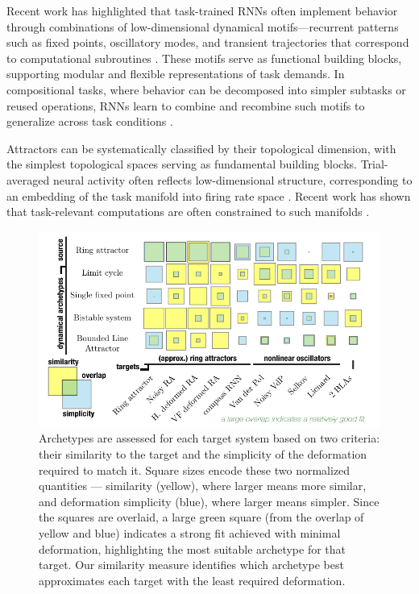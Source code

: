 \documentclass{article}
\theoremstyle{definition} \newtheorem{definition}{Definition}  \newtheorem{example}{Example}
\theoremstyle{remark} \newtheorem{remark}{Remark}
\newcounter{ct}
\begin{document}
Recent work has highlighted that task-trained RNNs often implement behavior through combinations of low-dimensional dynamical motifs—recurrent patterns such as fixed points, oscillatory modes, and transient trajectories that correspond to computational subroutines \citep{driscoll2024flexible}.
These motifs serve as functional building blocks, supporting modular and flexible representations of task demands. 
In compositional tasks, where behavior can be decomposed into simpler subtasks or reused operations, RNNs learn to combine and recombine such motifs to generalize across task conditions \citep{tafazoli2024building}.

Attractors can be systematically classified by their topological dimension, with the simplest topological spaces serving as fundamental building blocks.
Trial-averaged neural activity often reflects low-dimensional structure, corresponding to an embedding of the task manifold into firing rate space \citep{gao2015simplicity}.
Recent work has shown that task-relevant computations are often constrained to such manifolds \citep{langdon2023unifying,can2021emergence,cueva2021continuous,gort2024emergence,mishra2021continual,chaudhuri2019attractor,ghazizadeh2021slowmanifold,duncker2021dynamics, pezon2024linking,fortunato2024nonlinear}.

\begin{figure}[t!bhp]
    \centering
    \includegraphics[width=.9\linewidth]{archetype2target}
    \caption{Archetypes are assessed for each target system based on two criteria: their similarity to the target and the simplicity of the deformation required to match it. Square sizes encode these two normalized quantities — similarity (yellow), where larger means more similar, and deformation simplicity (blue), where larger means simpler.
     Since the squares are overlaid, a large green square (from the overlap of yellow and blue) indicates a strong fit achieved with minimal deformation, highlighting the most suitable archetype for that target.
 Our similarity measure identifies which archetype best approximates each target with the least required deformation.
    }
    \label{fig:archetype2target}
\end{figure}
\end{document}

